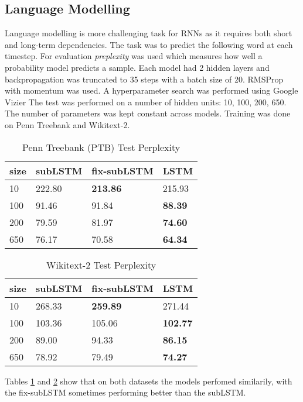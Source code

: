 \subsection{Language Modelling}
Language modelling is more challenging task for RNNs as it requires both short and long-term dependencies. The task was to predict the following word at each timestep. For evaluation \textit{preplexity} was used which measures how well a probability model predicts a sample. Each model had 2 hidden layers and backpropagation was truncated to 35 steps with a batch size of 20. RMSProp with momentum was used. A hyperparameter search was performed using Google Vizier
The test was performed on a number of hidden units: 10, 100, 200, 650. The number of parameters was kept constant across models. Training was done on Penn Treebank and Wikitext-2.
\begin{table}[h!]
\caption{Penn Treebank (PTB) Test Perplexity}\label{tab:penn}
\centering
\begin{tabular}{llll}
\hline
size & subLSTM & fix-subLSTM & LSTM   \\ \hline
10   & 222.80  & \textbf{213.86}      & 215.93 \\
100  & 91.46   & 91.84       & \textbf{88.39}  \\
200  & 79.59   & 81.97       & \textbf{74.60}  \\
650  & 76.17   & 70.58       & \textbf{64.34}  \\ \hline
\end{tabular}
\end{table}
\begin{table}[h!]
\caption{Wikitext-2 Test Perplexity}\label{tab:wiki}
\centering
\begin{tabular}{llll}
\hline
size & subLSTM & fix-subLSTM & LSTM   \\ \hline
10   & 268.33  & \textbf{259.89}      & 271.44 \\
100  & 103.36   & 105.06       & \textbf{102.77}  \\
200  & 89.00   & 94.33       & \textbf{86.15}  \\
650  & 78.92   & 79.49       & \textbf{74.27}  \\ \hline
\end{tabular}
\end{table}
Tables \ref{tab:penn} and \ref{tab:wiki} show that on both datasets the models perfomed similarily, with the fix-subLSTM sometimes performing better than the subLSTM.